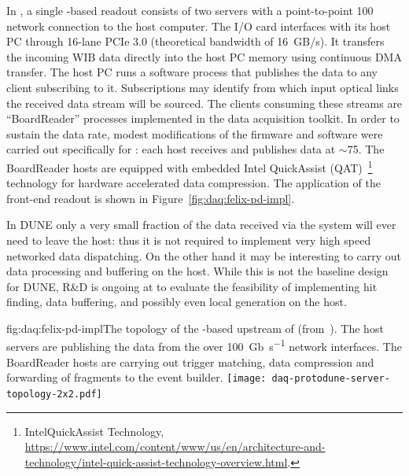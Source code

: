 In , a single  -based readout consists of two servers with a point-to-point \SI{100}{\Gbps} network connection to the  host computer.
The  I/O card interfaces with its host PC through 16-lane PCIe 3.0 (theoretical bandwidth of \SI{16}{GB/s}).
It transfers the incoming WIB data directly into the host PC memory using continuous DMA transfer. The  host PC runs a software process that publishes the data to any client subscribing to it.
Subscriptions may identify from which input optical links the received data stream will be sourced.
The clients consuming these streams are ``BoardReader'' processes implemented in the  data acquisition toolkit.
In order to sustain the data rate, modest modifications of the firmware and software were carried out specifically for : each  host receives and publishes data at $\sim$\SI{75}{\Gbps}. The BoardReader hosts are equipped with embedded Intel QuickAssist (QAT)~\footnote{Intel\textregistered QuickAssist Technology, \url{https://www.intel.com/content/www/us/en/architecture-and-technology/intel-quick-assist-technology-overview.html}.} technology for hardware accelerated data compression. The  application of the  front-end readout is shown in Figure~\ref{fig:daq:felix-pd-impl}.


In DUNE only a very small fraction of the data received via the 
system will ever need to leave the host: thus it is not required to
implement very high speed networked data dispatching. On the other
hand it may be interesting to carry out data processing and buffering
on the host. While this is not the baseline design for DUNE, R\&D is
ongoing at  to evaluate the feasibility of
implementing hit finding, data buffering, and possibly even local
 generation on the  host. 


\begin{dunefigure}{fig:daq:felix-pd-impl}{The topology of the -based
    upstream  of  (from~\cite{pdsp-felix}). The  host servers are publishing the data from the  over \SI{100}{Gb\per\second} network interfaces. The BoardReader hosts are carrying out trigger matching, data compression and forwarding of fragments to the event builder.}
 \texttt{[image: daq-protodune-server-topology-2x2.pdf]}
\end{dunefigure}

